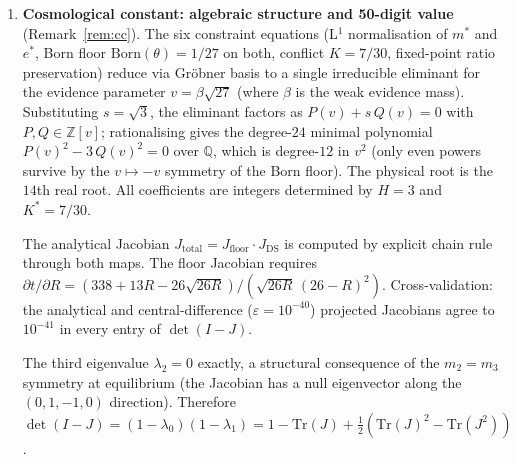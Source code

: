 \documentclass[11pt,a4paper]{article}
\theoremstyle{definition}
\theoremstyle{remark}
\newcommand{\dbar}{\bar{\partial}}
\begin{document}
\begin{enumerate}[nosep]
The $\mathrm{SO}(4)$ decomposition of $\dbar\Phi$ across $5000$ random floor-active states (not at the equilibrium) gives sector fractions: $(1,1)$ scalar $45.1\%$; $(3,1)\oplus(1,3)$ gauge $4.9\%$; $(3,3)$ gravity $50.0\%$. (At the $K^*=7/30$ equilibrium, the fractions are $23\%/26\%/51\%$---Remark~\ref{rem:floor_active}. The difference reflects the concentration of mass at equilibrium, where the singleton dominance amplifies the gauge sector.) The maximum of the gauge-sector norm $\|\dbar\Phi_{(3,1)\oplus(1,3)}\|$ over $B$ is $0.344$---this is $C_{\mathrm{gauge}}(H\!=\!3)$ in Theorem~\ref{thm:regularity}.

On coupled 1D ($N\!=\!30$) and 3D ($N\!=\!8^3$) lattices with non-trivial initial orientation patterns: the dynamics converges to the DS equilibrium where $\|\dbar\Phi\|=1.12$ (Remark~\ref{rem:floor_active}). The anti-holomorphic Jacobian is nonzero at the equilibrium because the floor fires at every DS step (the DS map contracts $\theta$, and the floor restores it). The Born floor held at $1/27$ in every configuration. The bound $\|\dbar\Phi_{(3,1)\oplus(1,3)}\|\leq C_{\mathrm{gauge}}=0.344$ (Theorem~\ref{thm:regularity}) holds uniformly.

\item \textbf{Cosmological constant: algebraic structure and 50-digit value} (Remark~\ref{rem:cc}). The six constraint equations (L$^1$ normalisation of $m^*$ and $e^*$, Born floor $\mathrm{Born}(\theta)=1/27$ on both, conflict $K=7/30$, fixed-point ratio preservation) reduce via Gr\"obner basis to a single irreducible eliminant for the evidence parameter $v=\beta\sqrt{27}$ (where $\beta$ is the weak evidence mass). Substituting $s=\sqrt{3}$, the eliminant factors as $P(v)+s\,Q(v)=0$ with $P,Q\in\mathbb{Z}[v]$; rationalising gives the degree-$24$ minimal polynomial $P(v)^2-3\,Q(v)^2=0$ over $\mathbb{Q}$, which is degree-$12$ in $v^2$ (only even powers survive by the $v\mapsto-v$ symmetry of the Born floor). The physical root is the $14$th real root. All coefficients are integers determined by $H=3$ and $K^*=7/30$.

The analytical Jacobian $J_{\mathrm{total}}=J_{\mathrm{floor}}\cdot J_{\mathrm{DS}}$ is computed by explicit chain rule through both maps. The floor Jacobian requires $\partial t/\partial R=(338+13R-26\sqrt{26R})/({\sqrt{26R}\,(26-R)^2})$. Cross-validation: the analytical and central-difference ($\varepsilon=10^{-40}$) projected Jacobians agree to $10^{-41}$ in every entry of $\det(I-J)$.

The third eigenvalue $\lambda_2=0$ exactly, a structural consequence of the $m_2=m_3$ symmetry at equilibrium (the Jacobian has a null eigenvector along the $(0,1,-1,0)$ direction). Therefore $\det(I-J)=(1-\lambda_0)(1-\lambda_1)=1-\mathrm{Tr}(J)+\tfrac{1}{2}(\mathrm{Tr}(J)^2-\mathrm{Tr}(J^2))$.


\end{enumerate}
\end{document}
